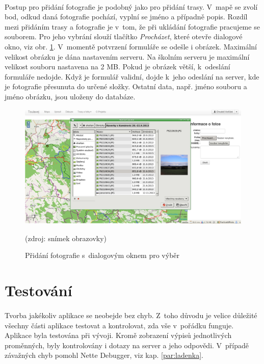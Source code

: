 \documentclass[11pt,a4paper,titlepage,oneside]{book}
\begin{document}
		
			\paragraph{}Postup pro přidání fotografie je podobný jako pro přidání trasy. V~mapě se zvolí bod, odkud daná fotografie pochází, vyplní se jméno a případně popis. Rozdíl mezi přidáním trasy a fotografie je v~tom, že při ukládání fotografie pracujeme se souborem. Pro jeho vybrání slouží tlačítko \textit{Procházet}, které otevře dialogové okno, viz obr. \ref{fig:addImage}. V~momentě potvrzení formuláře se odešle i obrázek. Maximální velikost obrázku je dána nastavením serveru. Na školním serveru je maximální velikost souboru nastavena na 2 MB. Pokud je obrázek větší, k~odeslání formuláře nedojde. Když je formulář validní, dojde k~jeho odeslání na server, kde je fotografie přesunuta do určené složky. Ostatní data, např. jméno souboru a jméno obrázku, jsou uloženy do databáze.
		\begin{figure}[!h]
			\begin{center}
				\includegraphics[width=12cm]{obrazky/toulavej/addImage.png}
				\caption{Přidání fotografie s~dialogovým oknem pro výběr}
				\label{fig:addImage}
				(zdroj: snímek obrazovky)
			\end{center}
		\end{figure}


		\section{Testování}
		\paragraph{} Tvorba jakékoliv aplikace se neobejde bez chyb. Z~toho důvodu je velice důležité všechny části aplikace testovat a kontrolovat, zda vše v~pořádku funguje. Aplikace  byla testována při vývoji. Kromě zobrazení výpisů jednotlivých proměnných, byly kontrolovány i dotazy na server a jeho odpovědi. V~případě závažných chyb pomohl Nette Debugger, viz kap. \ref{par:ladenka}.
\end{document}

